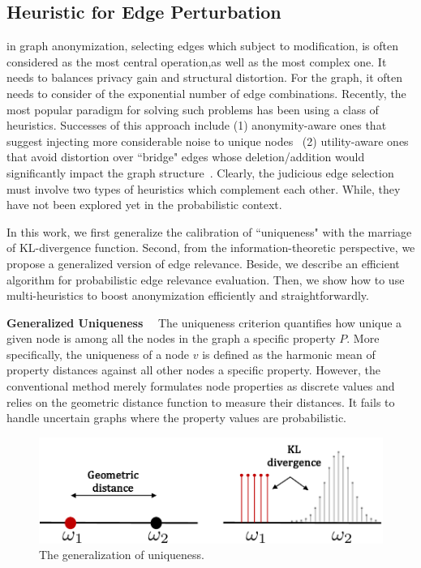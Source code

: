\subsection{Heuristic for Edge Perturbation}
in graph anonymization, selecting edges which subject to modification, is often considered as the most central operation,as well as the most complex one. 
It needs to balances privacy gain and structural distortion. 
For the graph, it often needs to consider of the exponential number of edge combinations. 
Recently, the most popular paradigm for solving such problems has been using a class of heuristics. 
Successes of this approach include
(1) anonymity-aware ones that suggest injecting more considerable noise to unique nodes~\cite{Ying2009,Boldi_Injecting_2012,Hay_Anonymizing_2007} 
(2) utility-aware ones that avoid distortion over ``bridge" edges whose deletion/addition would significantly impact the graph structure~\cite{Wang2011,Ninggal_Utility_2015}. 
Clearly, the judicious edge selection must involve two types of heuristics which complement each other. While, they have not been explored yet in the probabilistic context.

In this work, we first generalize the calibration of ``uniqueness" with the marriage of KL-divergence function. 
Second, from the information-theoretic perspective, we propose a generalized version of edge relevance. 
Beside, we describe an efficient algorithm for probabilistic edge relevance evaluation.
Then, we show how to use multi-heuristics to boost anonymization efficiently and straightforwardly.

\textbf{Generalized Uniqueness}~~
The uniqueness criterion quantifies how unique a given node is among all the nodes in the graph {\wrt} a specific property $P$. 
More specifically, the uniqueness of a node $v$ is defined as the harmonic mean of property distances against all other nodes {\wrt} a specific property. 
However, the conventional method merely formulates node properties as discrete values and relies on the geometric distance function to measure their distances.  
It fails to handle uncertain graphs where the property values are probabilistic.

\begin{figure}[!htb]
  \centering
        \includegraphics[width=\linewidth]{figure/unique.pdf}
  \caption{The generalization of uniqueness.}
\end{figure}

